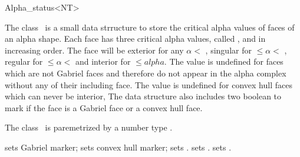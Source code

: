 

\begin{ccRefClass}{Alpha_status<NT>}  %


\ccDefinition
  
The class \ccRefName\ is a small data strructure to store
the critical alpha values of faces of an alpha shape.
Each face has three critical alpha values, called
,  and  in increasing order.
The face will be exterior for any $\alpha < $ ,
singular for  $\leq  \alpha  < $ ,
regular for   $\leq  \alpha < $ 
and interior for  $ \leq alpha$.
The value  is undefined for faces which are not Gabriel
faces and therefore do not appear in the alpha complex
without any of their
including face. The value  is undefined
for convex hull faces which can never be interior,
The data structure also includes two boolean to mark
if the face is a Gabriel face or a convex hull face.

The class \ccRefName\ is paremetrized by a number type .





\ccCreation
{}  %


\ccModifiers
{} { sets Gabriel marker;}
\ccGlue
{} {sets convex hull marker;}
\ccGlue
{} {sets .}
\ccGlue
{} {sets .}
\ccGlue
{} {sets .}



\end{ccRefClass}
